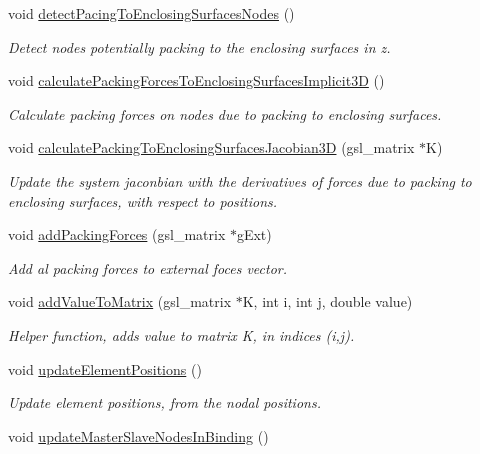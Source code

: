 \begin{DoxyCompactItemize}
void \hyperlink{classSimulation_ac1225a76f3acef7e6ecc175d386b6b86}{detect\+Pacing\+To\+Enclosing\+Surfaces\+Nodes} ()
\begin{DoxyCompactList}\small\item\em Detect nodes potentially packing to the enclosing surfaces in z. \end{DoxyCompactList}\item 
void \hyperlink{classSimulation_a3b2d417e1f2814ffd8e34c186508c2f2}{calculate\+Packing\+Forces\+To\+Enclosing\+Surfaces\+Implicit3\+D} ()
\begin{DoxyCompactList}\small\item\em Calculate packing forces on nodes due to packing to enclosing surfaces. \end{DoxyCompactList}\item 
void \hyperlink{classSimulation_a4b259e3827b74767c8005b2126191609}{calculate\+Packing\+To\+Enclosing\+Surfaces\+Jacobian3\+D} (gsl\+\_\+matrix $\ast$K)
\begin{DoxyCompactList}\small\item\em Update the system jaconbian with the derivatives of forces due to packing to enclosing surfaces, with respect to positions. \end{DoxyCompactList}\item 
void \hyperlink{classSimulation_a7a62be5131e130aa7f631201d5a4a49a}{add\+Packing\+Forces} (gsl\+\_\+matrix $\ast$g\+Ext)
\begin{DoxyCompactList}\small\item\em Add al packing forces to external foces vector. \end{DoxyCompactList}\item 
\hypertarget{classSimulation_ac096cfe7f8b3b7b66f6af2a87ff6556f}{}void \hyperlink{classSimulation_ac096cfe7f8b3b7b66f6af2a87ff6556f}{add\+Value\+To\+Matrix} (gsl\+\_\+matrix $\ast$K, int i, int j, double value)\label{classSimulation_ac096cfe7f8b3b7b66f6af2a87ff6556f}

\begin{DoxyCompactList}\small\item\em Helper function, adds value to matrix K, in indices (i,j). \end{DoxyCompactList}\item 
\hypertarget{classSimulation_aa92f90b98dc049a3206b4906ebf52585}{}void \hyperlink{classSimulation_aa92f90b98dc049a3206b4906ebf52585}{update\+Element\+Positions} ()\label{classSimulation_aa92f90b98dc049a3206b4906ebf52585}

\begin{DoxyCompactList}\small\item\em Update element positions, from the nodal positions. \end{DoxyCompactList}\item 
\hypertarget{classSimulation_a59684286f79843524da38d1bb30718a6}{}void \hyperlink{classSimulation_a59684286f79843524da38d1bb30718a6}{update\+Master\+Slave\+Nodes\+In\+Binding} ()\label{classSimulation_a59684286f79843524da38d1bb30718a6}


\end{DoxyCompactItemize}
